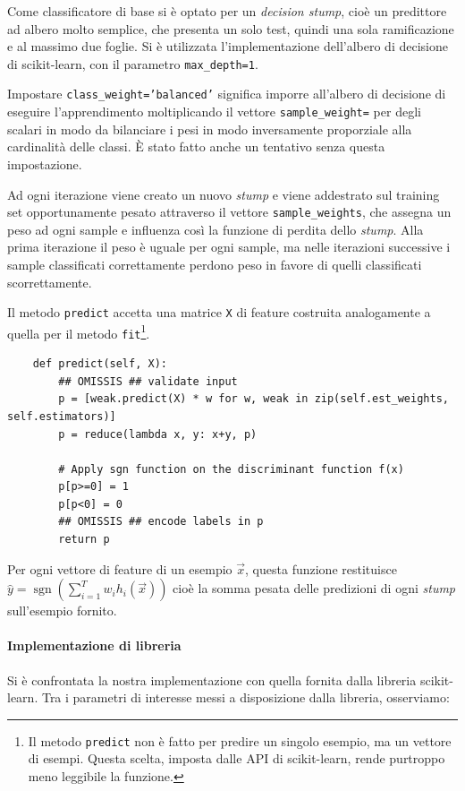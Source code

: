 \documentclass[12pt,a4paper,oneside,hidelinks]{report}
\DeclareMathOperator*{\sgn}{sgn}
\begin{document}
Come classificatore di base si è optato per un \emph{decision stump}, cioè un predittore ad albero molto semplice, che presenta un solo test, quindi una sola ramificazione e al massimo due foglie. 
Si è utilizzata l'implementazione dell'albero di decisione di scikit-learn, con il parametro \texttt{max\_depth=1}. 

Impostare \texttt{class\_weight='balanced'} significa imporre all'albero di decisione di eseguire l'apprendimento moltiplicando il vettore \texttt{sample\_weight=} per degli scalari in modo da bilanciare i pesi in modo inversamente proporziale alla cardinalità delle classi. È stato fatto anche un tentativo senza questa impostazione.

Ad ogni iterazione viene creato un nuovo \emph{stump} e viene addestrato sul training set opportunamente pesato attraverso il vettore \texttt{sample\_weights}, che assegna un peso ad ogni sample e influenza così la funzione di perdita dello \emph{stump}.
Alla prima iterazione il peso è uguale per ogni sample, ma nelle iterazioni successive i sample classificati correttamente perdono peso in favore di quelli classificati scorrettamente.

Il metodo \texttt{predict} accetta una matrice \texttt{X} di feature costruita analogamente a quella per il metodo \texttt{fit}\footnote{Il metodo \texttt{predict} non è fatto per predire un singolo esempio, ma un vettore di esempi. Questa scelta, imposta dalle API di scikit-learn, rende purtroppo meno leggibile la funzione.}.

\begin{lstlisting}
    def predict(self, X):
        ## OMISSIS ## validate input
        p = [weak.predict(X) * w for w, weak in zip(self.est_weights, self.estimators)]
        p = reduce(lambda x, y: x+y, p)

        # Apply sgn function on the discriminant function f(x)    
        p[p>=0] = 1
        p[p<0] = 0
        ## OMISSIS ## encode labels in p
        return p
\end{lstlisting}
Per ogni vettore di feature di un esempio $\vec{x}$, questa funzione restituisce
$ \hat{y}=\sgn(\sum_{i=1}^{T} w_{i}h_{i}(\vec{x})) $
cioè la somma pesata delle predizioni di ogni \emph{stump} sull'esempio fornito.

\paragraph{Implementazione di libreria}
Si è confrontata la nostra implementazione con quella fornita dalla libreria scikit-learn. Tra i parametri di interesse messi a disposizione dalla libreria, osserviamo:
\end{document}
